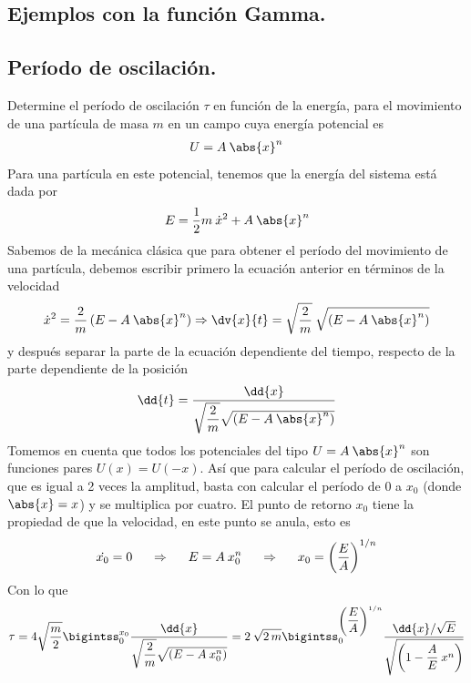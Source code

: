 \subsection{Ejemplos con la función Gamma.}
\subsection*{Período de oscilación.}
Determine el período de oscilación $\tau$ en función de la energía, para el movimiento de una partícula de masa $m$ en un campo cuya energía potencial es
\begin{align*}
U = A \: \abs{x}^{n}
\end{align*}
Para una partícula en este potencial, tenemos que la energía del sistema está dada por
\begin{align*}
E = \dfrac{1}{2} m \: \dot{x}^{2} + A \: \abs{x}^{n}
\end{align*}
Sabemos de la mecánica clásica que para obtener el período del movimiento de una partícula, debemos escribir primero la ecuación anterior en términos de la velocidad
\begin{align*}
\dot{x}^{2} = \dfrac{2}{m} \left( E - A \: \abs{x}^{n} \right) \Rightarrow \dv{x}{t} =  \sqrt{\dfrac{2}{m}} \: \sqrt{\left( E - A \: \abs{x}^{n} \right)}
\end{align*}
y después separar la parte de la ecuación dependiente del tiempo, respecto de la parte dependiente de la posición
\begin{align*}
\dd{t} = \dfrac{\dd{x}}{\sqrt{\dfrac{2}{m}} \sqrt{\left( E - A \: \abs{x}^{n} \right)}}
\end{align*}
Tomemos en cuenta que todos los potenciales del tipo $U = A \: \abs{x}^{n}$ son funciones pares $U(x) =  U(-x)$. Así que para calcular el período de oscilación, que es igual a 2 veces la amplitud, basta con calcular el período de $0$ a $x_{0}$ (donde $\abs{x} = x$) y se multiplica por cuatro. El punto de retorno $x_{0}$ tiene la propiedad de que la velocidad, en este punto se anula, esto es
\begin{align*}
\dot{x_{0}} = 0 \hspace{0.5cm} \Rightarrow \hspace{0.5cm} E = A \: x_{0}^{n} \hspace{0.5cm} \Rightarrow \hspace{0.5cm} x_{0} = \left( \dfrac{E}{A} \right)^{1/n}
\end{align*}
Con lo que
\begin{align*}
\tau =  4 \sqrt{\dfrac{m}{2}} \bigintss_{0}^{x_{0}} \dfrac{\dd{x}}{\sqrt{\dfrac{2}{m}} \sqrt{\left( E - A \: x_{0}^{n} \right)}} = 2 \: \sqrt{2 \, m} \bigintss_{0}^{\left( \dfrac{E}{A} \right)^{1/n}} \dfrac{\dd{x} / \sqrt{E}}{\sqrt{ \left( 1 - \dfrac{A}{E} \: x^{n} \right) }}
\end{align*}
